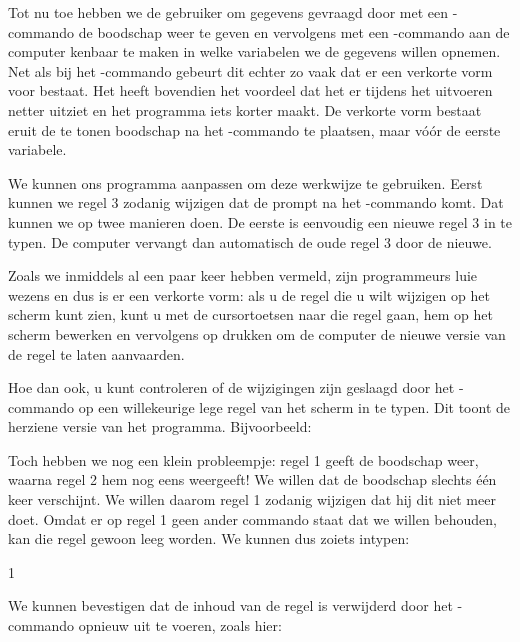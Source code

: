 Tot nu toe hebben we de gebruiker om gegevens gevraagd door met een -commando de boodschap weer te geven en vervolgens met een -commando aan de computer kenbaar te maken in welke variabelen we de gegevens willen opnemen. Net als bij het -commando gebeurt dit echter zo vaak dat er een verkorte vorm voor bestaat. Het heeft bovendien het voordeel dat het er tijdens het uitvoeren netter uitziet en het programma iets korter maakt. De verkorte vorm bestaat eruit de te tonen boodschap na het -commando te plaatsen, maar vóór de eerste variabele.

We kunnen ons programma aanpassen om deze werkwijze te gebruiken. Eerst kunnen we regel 3 zodanig wijzigen dat de prompt na het -commando komt. Dat kunnen we op twee manieren doen. De eerste is eenvoudig een nieuwe regel 3 in te typen. De computer vervangt dan automatisch de oude regel 3 door de nieuwe.

Zoals we inmiddels al een paar keer hebben vermeld, zijn programmeurs luie wezens en dus is er een verkorte vorm: als u de regel die u wilt wijzigen op het scherm kunt zien, kunt u met de cursortoetsen naar die regel gaan, hem op het scherm bewerken en vervolgens op  drukken om de computer de nieuwe versie van de regel te laten aanvaarden.

\needspace{4cm}
Hoe dan ook, u kunt controleren of de wijzigingen zijn geslaagd door het -commando op een willekeurige lege regel van het scherm in te typen. Dit toont de herziene versie van het programma. Bijvoorbeeld:


\needspace{3cm}
Toch hebben we nog een klein probleempje: regel 1 geeft de boodschap  weer, waarna regel 2 hem nog eens weergeeft! We willen dat de boodschap slechts één keer verschijnt. We willen daarom regel 1 zodanig wijzigen dat hij dit niet meer doet. Omdat er op regel 1 geen ander commando staat dat we willen behouden, kan die regel gewoon leeg worden. We kunnen dus zoiets intypen:

\begin{screencode}
1
\end{screencode}

\needspace{4cm}
We kunnen bevestigen dat de inhoud van de regel is verwijderd door het -commando opnieuw uit te voeren, zoals hier:

